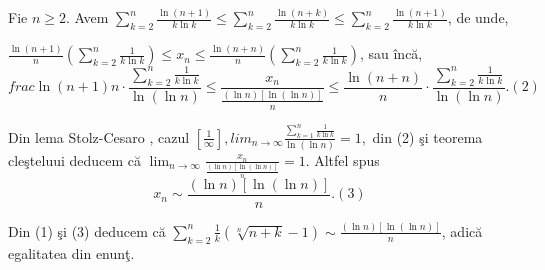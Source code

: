 \documentclass[a4paper,12pt,oneside]{report}
\begin{document}
Fie \(n\geq 2\). Avem \(\sum_{k=2}^{n}\frac{\ln \left ( n+1 \right )}{k\ln k}\leq \sum_{k=2}^{n}\frac{\ln \left ( n+k \right )}{k\ln k}\leq \sum_{k=2}^{n}\frac{\ln \left ( n+1 \right )}{k\ln k}\), de unde,

\(\frac{\ln \left ( n+1 \right )}{n}\left ( \sum_{k=2}^{n}\frac{1}{k\ln k } \right )\leq x_{n}\leq \frac{\ln \left ( n+n \right )}{n}\left ( \sum_{k=2}^{n}\frac{1}{k\ln k } \right )\), sau \^ inc\u a, 
\begin{displaymath}
  frac{\ln \left ( n+1 \right )}{n}\cdot \frac{\sum_{k=2}^{n}\frac{1}{k\ln k }}{\ln \left ( \ln n \right )}\leq \frac{x_{n}}{\frac{\left ( \ln n \right )\left [ \ln\left ( \ln n \right ) \right ]}{n}}\leq \frac{\ln \left ( n+n \right )}{n}\cdot \frac{\sum_{k=2}^{n}\frac{1}{k\ln k }}{\ln \left ( \ln n \right )}. (2)
\end{displaymath}


Din lema Stolz-Cesaro , cazul \(\left [ \frac{1}{\infty } \right ], lim_{n \to \infty }\frac{\sum_{k=1}^{n}\frac{1}{k\ln k}}{\ln\left ( \ln n \right ) } = 1,\) din (2) \c si teorema cle\c steluui deducem c\u a \(\lim_{n \to \infty }\frac{x_{n}}{\frac{\left ( \ln n  \right )\left [ \ln\left ( \ln n \right ) \right ]}{n}} = 1\). Altfel spus 
\begin{displaymath}
  x_{n}\sim \frac{\left ( \ln n \right )\left [ \ln\left ( \ln n \right ) \right ]}{n}. (3)
\end{displaymath}

Din (1) \c si (3) deducem c\u a \(\sum_{k=2}^{n}\frac{1}{k}\left ( \sqrt[n]{n+k}-1 \right )\sim \frac{\left ( \ln n \right )\left [ \ln\left ( \ln n \right ) \right ]}{n}\), adic\u a egalitatea din enun\c t. \cite{dumitru}



\setlength{\baselineskip}{\normalbaselineskip}
\setlength{\parskip}{0pt}

\end{document}
